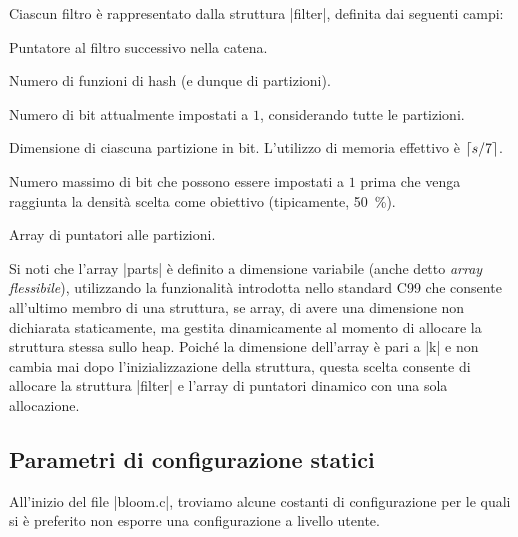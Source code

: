 Ciascun filtro è rappresentato dalla struttura \cverb|filter|, definita dai seguenti campi:

\begin{description}[leftmargin=!,labelwidth=8em,font={\bfseries\ttfamily}]
  \item[filter *next] Puntatore al filtro successivo nella catena.
  \item[uint32 k] Numero di funzioni di hash (e dunque di par\-ti\-zio\-ni).
  \item[uint64 b] Numero di bit attualmente impostati a $1$, con\-si\-de\-ran\-do tutte le
    partizioni.
  \item[uint64 s] Dimensione di ciascuna partizione in bit. L'utilizzo di memoria effettivo è
      $\lceil s/7\rceil$.
  \item[uint64 bmax] Numero massimo di bit che possono essere impostati a $1$ prima che venga
      raggiunta la densità scelta come obiettivo (tipicamente, \SI{50}{\percent}).
  \item[{uint8 *parts[]}] Array di puntatori alle partizioni.
\end{description}

Si noti che l'array \cverb|parts| è definito a dimensione variabile (anche detto \emph{array
flessibile}), utilizzando la funzionalità introdotta nello standard C99 che consente all'ultimo
membro di una struttura, se array, di avere una dimensione non dichiarata staticamente, ma gestita
dinamicamente al momento di allocare la struttura stessa sullo heap. Poiché la dimensione dell'array
è pari a \cverb|k| e non cambia mai dopo l'inizializzazione della struttura, questa scelta consente
di allocare la struttura \cverb|filter| e l'array di puntatori dinamico con una sola allocazione.

\subsection{Parametri di configurazione statici}
\label{sec:patch:staticparms}

All'inizio del file \cverb|bloom.c|, troviamo alcune costanti di configurazione per le quali si è
preferito non esporre una configurazione a livello utente.

